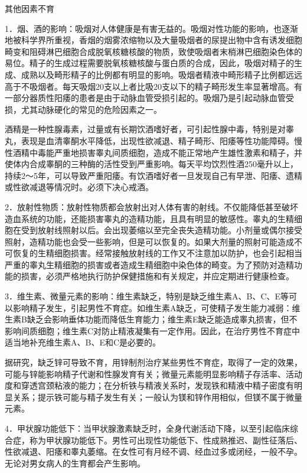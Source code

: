\documentclass[12pt,UTF8]{ctexbook}
\begin{document}
其他因素不育


1．烟、酒的影响：吸烟对人体健康是有害无益的。吸烟对性功能的影响，也逐渐地被科学界所重视，香烟的烟雾浓缩物以及大量吸烟者的尿提出物中含有诱发细胞畸变和阻碍淋巴细胞合成脱氧核糖核酸的物质，致使吸烟者末梢淋巴细胞染色体的易位。精子的生成过程需要脱氧核糖核酸与蛋白质的合成，因此，吸烟对精子的生成、成熟以及畸形精子的比例都有明显的影响。吸烟者精液中畸形精子比例都远远高于不吸烟者。每天吸烟20支以上者比吸20支以下的精子畸形发生率显著增高。有一部分器质性阳痿的患者是由于动脉血管受损引起的。吸烟乃是引起动脉血管受损，尤其动脉硬化的常见的危险因素之一。

酒精是一种性腺毒素，过量或有长期饮酒嗜好者，可引起性腺中毒，特别是对睾丸，表现是血清睾酮水平降低，出现性欲减退、精子畸形、阳痿等性功能障碍。慢性酒精中毒能严重地损害睾丸间质细胞，造成不能正常地产生雄性激素和精子，并使体内合成睾酮的三种酶的活性受到严重影响。每天平均饮烈性酒250毫升以上，持续2～5年，可以导致严重阳痿。有饮酒嗜好者一旦发现自己有早泄、阳痿、遗精或性欲减退等情况时。必须下决心戒酒。

2．放射性物质：放射性物质都会放射出对人体有害的射线。不仅能降低甚至破坏造血系统的功能，还能损害睾丸的造精功能，且具有明显的敏感性。睾丸的生精细胞在受到放射线照射以后。会出现萎缩以至完全丧失造精功能。小剂量或偶尔接受照射，造精功能也会受一些影响，但是可以恢复的。如果大剂量的照射可能造成不可恢复的生精细胞损害。经常接触放射线的工作又不注意加以防护，也会引起相当严重的睾丸生精细胞的损害或者造成生精细胞中染色体的畸变。为了预防对造精功能的损害，必须严格地执行防护保健措施和有关规定，并应定期进行健康检查。

3．维生素、微量元素的影响：维生素缺乏，特别是缺乏维生素A、B、C、E等可以影响精子发生，引起男性不育症。如维生素A缺乏，可使精子发生能力减弱：维生素B缺乏会影响垂体功能而降低生育能力；维生素E缺乏能造成睾丸损害，但不影响间质细胞；维生素C对防止精液凝集有一定作用。因此，在治疗男性不育症中适当地补充维生素A、B、E和C是必要的。

据研究，缺乏锌可导致不育，用锌制剂治疗某些男性不育症，取得了一定的效果，可能与锌能影响精子代谢和性腺发育有关；微量元素能明显影响精子存活率、活动度和穿透宫颈粘液的能力；在分析铁与精液关系时，发现铁和精液中精子密度有明显关系；提示铁可能与精子发生有关；一般认为镁和锌作用相似，但镁不属于微量元素。

4．甲状腺功能低下：当甲状腺激素缺乏时，全身代谢活动下降，以至引起临床综合症，称为甲状腺功能低下。男性可出现性功能低下、性成熟推迟、副性征落后、性欲减退、阳痿和睾丸萎缩。在女性可有月经不调、经血过多或闭经，一般不孕。无论对男女病人的生育都会产生影响。
\end{document}
